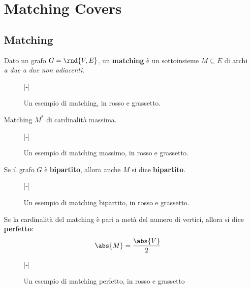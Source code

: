 \documentclass[\main/main.tex]{subfiles}
\begin{document}
\chapter{Matching Covers}



\section{Matching}
\setlength\columnsep{25pt}
\begin{multicols}{2}
	\begin{definition}
		Dato un grafo \(G=\rnd{V, E}\), un \textbf{matching} è un sottoinsieme \(M\subseteq E\) di archi \textit{a due a due non adiacenti}.
		\begin{figure}
			[-]
			\MatchingDefinition{}
			\caption{Un esempio di matching, in rosso e grassetto.}
		\end{figure}
	\end{definition}
	\begin{definition}
		Matching \(M^*\) di cardinalità massima.
		\begin{figure}
			[-]
			\MatchingDefinition{}
			\caption{Un esempio di matching massimo, in rosso e grassetto.}
		\end{figure}
	\end{definition}
	\begin{definition}
		Se il grafo \(G\) è \textbf{bipartito}, allora anche \(M\) si dice \textbf{bipartito}.
		\begin{figure}
			[-]
			\MatchingDefinition{}
			\caption{Un esempio di matching bipartito, in rosso e grassetto.}
		\end{figure}
	\end{definition}
	\begin{definition}
		Se la cardinalità del matching è pari a metà del numero di vertici, allora si dice \textbf{perfetto}:
		\[
			\abs{M} = \frac{\abs{V}}{2}
		\]
		\begin{figure}
			[-]
			\MatchingDefinition{}
			\caption{Un esempio di matching perfetto, in rosso e grassetto}
		\end{figure}
	\end{definition}
\end{multicols}
\end{document}
